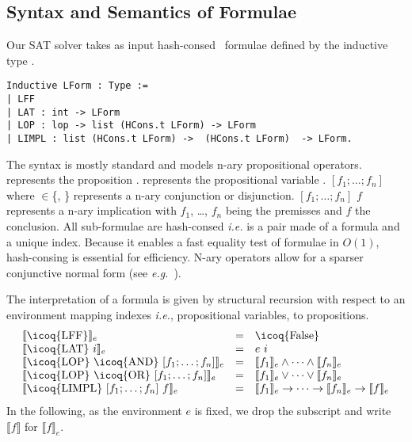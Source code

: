 \documentclass[utf8,a4paper,UKenglish,cleveref, autoref, thm-restate]{lipics-v2019}
\newcommand{\mcoq}[1]{\mbox{\icoq{#1}}}
\begin{document}
\subsection{Syntax and Semantics of Formulae}
\label{sec:syntax}
Our SAT solver takes as input hash-consed~\cite{Allen-hcons} formulae defined by the inductive type .
\begin{verbatim}
Inductive LForm : Type :=
| LFF
| LAT : int -> LForm
| LOP : lop -> list (HCons.t LForm) -> LForm
| LIMPL : list (HCons.t LForm) ->  (HCons.t LForm)  -> LForm.
\end{verbatim}
The syntax is mostly standard and models n-ary propositional operators.
%
 represents the proposition . 
 represents the propositional variable .
%
 $[f_1; \dots; f_n]$ where  $\in$\{,
\} represents a n-ary conjunction or disjunction.
%
 $[f_1; \dots; f_n]$ $f$ represents a n-ary implication
with $f_1$, \dots, $f_n$ being the premisses and $f$ the conclusion.
%
All sub-formulae are hash-consed \emph{i.e.} 
is a pair made of a formula and a unique index.
%
Because it enables a fast equality test of formulae in $O(1)$, hash-consing is essential for efficiency.
%
N-ary operators allow for a sparser conjunctive normal form (see \emph{e.g.}~\cite{LescuyerC09}).

The interpretation of a formula  is given by structural recursion with respect
to an environment  mapping indexes \emph{i.e.}, propositional variables, to
propositions.
\[
  \begin{array}{lcl}
    \llbracket \mcoq{LFF} \rrbracket_e &=& \mcoq{False} \\
    \llbracket \mcoq{LAT}\ i \rrbracket_e &=& e\ i \\
    \llbracket \mcoq{LOP}\  \mcoq{AND}\ [f_1;\dots;f_n] \rrbracket_e &=& \llbracket f_1 \rrbracket_e \land \dots\land \llbracket f_n \rrbracket_e\\
    \llbracket \mcoq{LOP}\  \mcoq{OR}\  [f_1;\dots;f_n] \rrbracket_e &=& %
    \llbracket f_1 \rrbracket_e \vee \dots\vee \llbracket f_n \rrbracket_e\\
    \llbracket \mcoq{LIMPL}\ [f_1;\dots;f_n]\  f \rrbracket_e &=& \llbracket f_1\rrbracket_e \rightarrow \dots \rightarrow \llbracket f_n \rrbracket_e \to \llbracket f \rrbracket_e \\
  \end{array}
\]
In the following, as the environment $e$ is fixed, we drop the
subscript and write $\llbracket f \rrbracket$ for $\llbracket f \rrbracket_e$.
\end{document}
